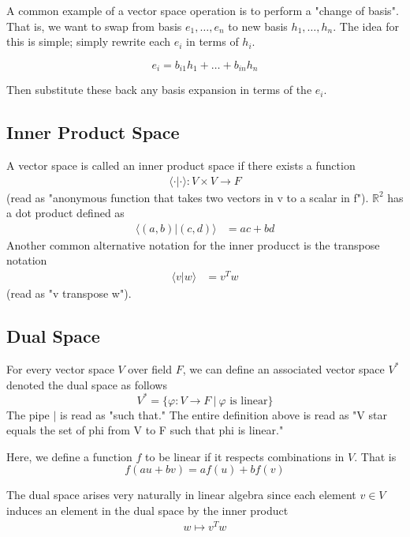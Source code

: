 \documentclass[book.tex]{subfiles}
\begin{document}
A common example of a vector space operation is to perform a "change of basis". That is, we want to swap from basis $e_1, \dotsc, e_n$ to new basis $h_1, \dotsc, h_n$. The idea for this is simple; simply rewrite each $e_i$ in terms of $h_i$.

\[ e_i = b_{i1} h_1 + \dotsc + b_{in} h_n \]

Then substitute these back any basis expansion in terms of the $e_i$.

\subsection{Inner Product Space}
A vector space is called an inner product space if there exists a function 
\begin{align}
    \langle \cdot | \cdot \rangle: V \times V \to F
\end{align}
(read as "anonymous function that takes two vectors in v to a scalar in f"). $\mathbb{R}^2$ has a dot product defined as
\begin{align}
    \langle (a, b) | (c, d) \rangle &= ac + bd
\end{align}
Another common alternative notation for the inner producct is the transpose notation
\begin{align}
    \langle v | w \rangle &= v^T w
\end{align}
(read as "v transpose w").
\subsection{Dual Space}
For every vector space $V$ over field $F$, we can define an associated vector space $V^*$ denoted the dual space as follows
\begin{equation}
    V^* = \{ \varphi: V \to F \ | \ \varphi \textrm{ is linear}\}
\end{equation}
The pipe $|$ is read as "such that." The entire definition above is read as "V star equals the set of phi from V to F such that phi is linear." 

Here, we define a function $f$ to be linear if it respects combinations in $V$. That is
\begin{equation}
    f(au + bv) = af(u) + bf(v)
\end{equation}

The dual space arises very naturally in linear algebra since each element $v \in V$ induces an element in the dual space by the inner product
\begin{align}
    w \mapsto v^T w
\end{align}
\end{document}

